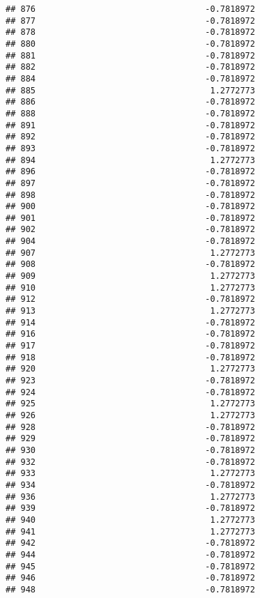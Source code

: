 \documentclass[
]{article}
\begin{document}
\begin{verbatim}
## 876                                  -0.7818972
## 877                                  -0.7818972
## 878                                  -0.7818972
## 880                                  -0.7818972
## 881                                  -0.7818972
## 882                                  -0.7818972
## 884                                  -0.7818972
## 885                                   1.2772773
## 886                                  -0.7818972
## 888                                  -0.7818972
## 891                                  -0.7818972
## 892                                  -0.7818972
## 893                                  -0.7818972
## 894                                   1.2772773
## 896                                  -0.7818972
## 897                                  -0.7818972
## 898                                  -0.7818972
## 900                                  -0.7818972
## 901                                  -0.7818972
## 902                                  -0.7818972
## 904                                  -0.7818972
## 907                                   1.2772773
## 908                                  -0.7818972
## 909                                   1.2772773
## 910                                   1.2772773
## 912                                  -0.7818972
## 913                                   1.2772773
## 914                                  -0.7818972
## 916                                  -0.7818972
## 917                                  -0.7818972
## 918                                  -0.7818972
## 920                                   1.2772773
## 923                                  -0.7818972
## 924                                  -0.7818972
## 925                                   1.2772773
## 926                                   1.2772773
## 928                                  -0.7818972
## 929                                  -0.7818972
## 930                                  -0.7818972
## 932                                  -0.7818972
## 933                                   1.2772773
## 934                                  -0.7818972
## 936                                   1.2772773
## 939                                  -0.7818972
## 940                                   1.2772773
## 941                                   1.2772773
## 942                                  -0.7818972
## 944                                  -0.7818972
## 945                                  -0.7818972
## 946                                  -0.7818972
## 948                                  -0.7818972

\end{verbatim}
\end{document}
